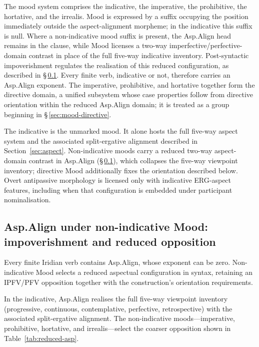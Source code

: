 The mood system comprises the indicative, the imperative, the prohibitive, the
hortative, and the irrealis. Mood is expressed by a suffix occupying the
position immediately outside the aspect-alignment morpheme; in the indicative
this suffix is null. Where a non-indicative mood suffix is present, the
Asp.Align head remains in the clause, while Mood licenses a two-way
imperfective/perfective-domain contrast in place of the full five-way
indicative inventory. Post-syntactic impoverishment regulates the realisation
of this reduced configuration, as described in
§\,\ref{sec:vm-mood-asp}. Every finite verb, indicative or not, therefore
carries an Asp.Align exponent. The imperative, prohibitive, and hortative
together form the directive domain, a unified subsystem whose case properties
follow from directive orientation within the reduced Asp.Align domain;
it is treated as a group beginning in §\,\ref{sec:mood-directive}.

The indicative is the unmarked mood. It alone hosts the full five-way aspect
system and the associated split-ergative alignment described in
Section~\ref{sec:aspect}. Non-indicative moods carry a reduced two-way
aspect-domain contrast in Asp.Align (§\,\ref{sec:vm-mood-asp}), which collapses
the five-way viewpoint inventory; directive Mood additionally fixes the
orientation described below. Overt antipassive morphology is licensed only
with indicative ERG-aspect features, including when that configuration is
embedded under participant nominalisation.

\subsection{Asp.Align under non-indicative Mood: impoverishment and reduced opposition}
\label{sec:vm-mood-asp}

Every finite Iridian verb contains Asp.Align, whose exponent can be zero.
Non-indicative Mood selects a reduced aspectual configuration in syntax,
retaining an IPFV/PFV opposition together with the construction's orientation
requirements.

In the indicative, Asp.Align realises the full five-way viewpoint inventory
(progressive, continuous, contemplative, perfective, retrospective) with the
associated split-ergative alignment. The non-indicative moods---imperative,
prohibitive, hortative, and irrealis---select the coarser
 opposition shown in
Table~\ref{tab:reduced-asp}.

